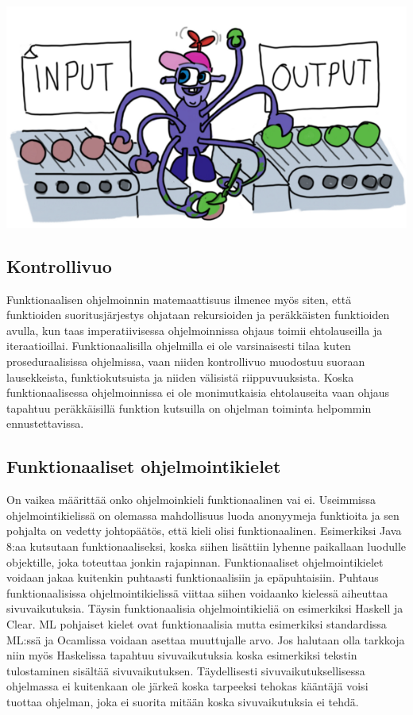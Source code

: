 \documentclass[12pt]{article}
\begin{document}
\includegraphics[width=\textwidth]{puhdasfunktio.png}


\subsection{Kontrollivuo}
Funktionaalisen ohjelmoinnin matemaattisuus ilmenee myös siten, että funktioiden suoritusjärjestys ohjataan rekursioiden ja peräkkäisten funktioiden avulla, kun taas imperatiivisessa ohjelmoinnissa ohjaus toimii ehtolauseilla ja iteraatioillai. Funktionaalisilla ohjelmilla ei ole varsinaisesti tilaa kuten proseduraalisissa ohjelmissa, vaan niiden kontrollivuo muodostuu suoraan lausekkeista, funktiokutsuista ja niiden välisistä riippuvuuksista. Koska funktionaalisessa ohjelmoinnissa ei ole monimutkaisia ehtolauseita vaan ohjaus tapahtuu peräkkäisillä funktion kutsuilla on ohjelman toiminta helpommin ennustettavissa.


\subsection{Funktionaaliset ohjelmointikielet}
On vaikea määrittää onko ohjelmoinkieli funktionaalinen vai ei. Useimmissa ohjelmointikielissä on olemassa mahdollisuus luoda anonyymeja funktioita ja sen pohjalta on vedetty johtopäätös, että kieli olisi funktionaalinen. Esimerkiksi Java 8:aa kutsutaan funktionaaliseksi, koska siihen lisättiin lyhenne paikallaan luodulle objektille, joka toteuttaa jonkin rajapinnan.
Funktionaaliset ohjelmointikielet voidaan jakaa kuitenkin puhtaasti funktionaalisiin ja epäpuhtaisiin. Puhtaus funktionaalisissa ohjelmointikielissä viittaa siihen voidaanko kielessä aiheuttaa sivuvaikutuksia. 
Täysin funktionaalisia ohjelmointikieliä on esimerkiksi Haskell ja Clear. ML pohjaiset kielet ovat funktionaalisia mutta esimerkiksi standardissa ML:ssä ja Ocamlissa voidaan asettaa muuttujalle arvo.
Jos halutaan olla tarkkoja niin myös Haskelissa tapahtuu sivuvaikutuksia koska esimerkiksi tekstin tulostaminen sisältää sivuvaikutuksen. Täydellisesti sivuvaikutuksellisessa ohjelmassa ei kuitenkaan ole järkeä koska tarpeeksi tehokas kääntäjä voisi tuottaa ohjelman, joka ei suorita mitään koska sivuvaikutuksia ei tehdä.
\end{document}
